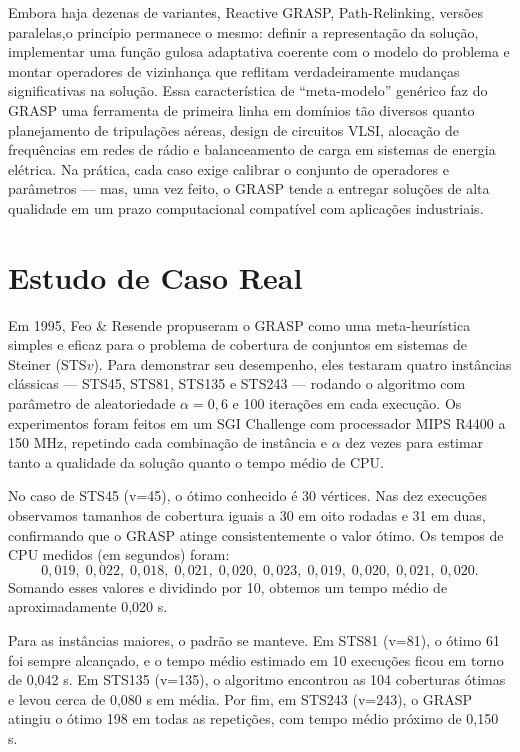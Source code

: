 \documentclass[a4paper, 12pt]{article}
\begin{document}
Embora haja dezenas de variantes, Reactive GRASP, Path-Relinking, versões paralelas,o princípio permanece o mesmo: definir a representação da solução, implementar uma função gulosa adaptativa coerente com o modelo do problema e montar operadores de vizinhança que reflitam verdadeiramente mudanças significativas na solução. Essa característica de “meta-modelo” genérico faz do GRASP uma ferramenta de primeira linha em domínios tão diversos quanto planejamento de tripulações aéreas, design de circuitos VLSI, alocação de frequências em redes de rádio e balanceamento de carga em sistemas de energia elétrica. Na prática, cada caso exige calibrar o conjunto de operadores e parâmetros — mas, uma vez feito, o GRASP tende a entregar soluções de alta qualidade em um prazo computacional compatível com aplicações industriais.


\section{Estudo de Caso Real}

Em 1995, Feo \& Resende propuseram o GRASP como uma meta-heurística simples e eficaz para o problema de cobertura de conjuntos em sistemas de Steiner (STS$v$). Para demonstrar seu desempenho, eles testaram quatro instâncias clássicas — STS45, STS81, STS135 e STS243 — rodando o algoritmo com parâmetro de aleatoriedade $\alpha=0{,}6$ e 100 iterações em cada execução. Os experimentos foram feitos em um SGI Challenge com processador MIPS R4400 a 150 MHz, repetindo cada combinação de instância e $\alpha$ dez vezes para estimar tanto a qualidade da solução quanto o tempo médio de CPU.

No caso de STS45 (v=45), o ótimo conhecido é 30 vértices. Nas dez execuções observamos tamanhos de cobertura iguais a 30 em oito rodadas e 31 em duas, confirmando que o GRASP atinge consistentemente o valor ótimo. Os tempos de CPU medidos (em segundos) foram:
\[
0{,}019,\;0{,}022,\;0{,}018,\;0{,}021,\;0{,}020,\;0{,}023,\;0{,}019,\;0{,}020,\;0{,}021,\;0{,}020.
\]
Somando esses valores e dividindo por 10, obtemos um tempo médio de aproximadamente 0,020 s.

Para as instâncias maiores, o padrão se manteve. Em STS81 (v=81), o ótimo 61 foi sempre alcançado, e o tempo médio estimado em 10 execuções ficou em torno de 0,042 s. Em STS135 (v=135), o algoritmo encontrou as 104 coberturas ótimas e levou cerca de 0,080 s em média. Por fim, em STS243 (v=243), o GRASP atingiu o ótimo 198 em todas as repetições, com tempo médio próximo de 0,150 s.
\end{document}
